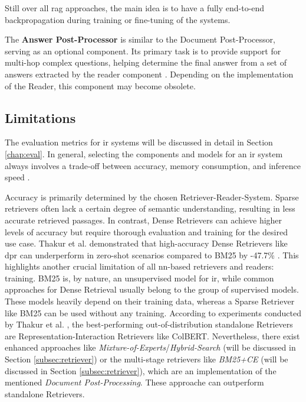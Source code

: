 Still over all \gls{rag} approaches, the main idea is to have a fully end-to-end backpropagation during training or fine-tuning of the systems.

The \textbf{Answer Post-Processor} is similar to the Document Post-Processor, serving as an optional component. Its primary task is to provide support for multi-hop complex questions, helping determine the final answer from a set of answers extracted by the reader component \cite{zhu_retrieving_2021}. Depending on the implementation of the Reader, this component may become obsolete.


\subsection{Limitations}
\label{subsec:qa_limitations}

The evaluation metrics for \gls{ir} systems will be discussed in detail in Section \ref{chap:eval}. In general, selecting the components and models for an \gls{ir} system always involves a trade-off between accuracy, memory consumption, and inference speed \cite{zhang_survey_2023}.

Accuracy is primarily determined by the chosen Retriever-Reader-System. Sparse retrievers often lack a certain degree of semantic understanding, resulting in less accurate retrieved passages. In contrast, Dense Retrievers can achieve higher levels of accuracy but require thorough evaluation and training for the desired use case. Thakur et al. demonstrated that high-accuracy Dense Retrievers like \gls{dpr} can underperform in zero-shot scenarios compared to BM25 by -47.7\% \cite{thakur_beir_2021}. This highlights another crucial limitation of all \gls{nn}-based retrievers and readers: training. BM25 is, by nature, an unsupervised model for \gls{ir}, while common approaches for Dense Retrieval usually belong to the group of supervised models. These models heavily depend on their training data, whereas a Sparse Retriever like BM25 can be used without any training. According to experiments conducted by Thakur et al. \cite{thakur_beir_2021}, the best-performing out-of-distribution standalone Retrievers are Representation-Interaction Retrievers like ColBERT. Nevertheless, there exist enhanced approaches like \textit{Mixture-of-Experts}/\textit{Hybrid-Search} (will be discussed in Section \ref{subsec:retriever}) or the multi-stage retrievers like \textit{BM25+CE} (will be discussed in Section \ref{subsec:retriever}), which are an implementation of the mentioned \textit{Document Post-Processing}. These approache can outperform standalone Retrievers.

